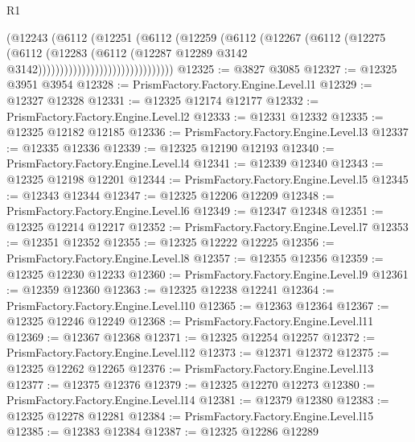 \begin{lexlean}{R1}
\begin{coremodule}
                                        (@12243
                                          (@6112
                                            (@12251
                                              (@6112
                                                (@12259
                                                  (@6112
                                                    (@12267
                                                      (@6112
                                                        (@12275
                                                          (@6112
                                                            (@12283
                                                              (@6112
                                                                (@12287
                                                                  @12289
                                                                  @3142
                                                                  @3142)))))))))))))))))))))))))))))))
@12325 := @3827 @3085
@12327 := @12325 @3951 @3954
@12328 := PrismFactory.Factory.Engine.Level.l1
@12329 := @12327 @12328
@12331 := @12325 @12174 @12177
@12332 := PrismFactory.Factory.Engine.Level.l2
@12333 := @12331 @12332
@12335 := @12325 @12182 @12185
@12336 := PrismFactory.Factory.Engine.Level.l3
@12337 := @12335 @12336
@12339 := @12325 @12190 @12193
@12340 := PrismFactory.Factory.Engine.Level.l4
@12341 := @12339 @12340
@12343 := @12325 @12198 @12201
@12344 := PrismFactory.Factory.Engine.Level.l5
@12345 := @12343 @12344
@12347 := @12325 @12206 @12209
@12348 := PrismFactory.Factory.Engine.Level.l6
@12349 := @12347 @12348
@12351 := @12325 @12214 @12217
@12352 := PrismFactory.Factory.Engine.Level.l7
@12353 := @12351 @12352
@12355 := @12325 @12222 @12225
@12356 := PrismFactory.Factory.Engine.Level.l8
@12357 := @12355 @12356
@12359 := @12325 @12230 @12233
@12360 := PrismFactory.Factory.Engine.Level.l9
@12361 := @12359 @12360
@12363 := @12325 @12238 @12241
@12364 := PrismFactory.Factory.Engine.Level.l10
@12365 := @12363 @12364
@12367 := @12325 @12246 @12249
@12368 := PrismFactory.Factory.Engine.Level.l11
@12369 := @12367 @12368
@12371 := @12325 @12254 @12257
@12372 := PrismFactory.Factory.Engine.Level.l12
@12373 := @12371 @12372
@12375 := @12325 @12262 @12265
@12376 := PrismFactory.Factory.Engine.Level.l13
@12377 := @12375 @12376
@12379 := @12325 @12270 @12273
@12380 := PrismFactory.Factory.Engine.Level.l14
@12381 := @12379 @12380
@12383 := @12325 @12278 @12281
@12384 := PrismFactory.Factory.Engine.Level.l15
@12385 := @12383 @12384
@12387 := @12325 @12286 @12289

\end{coremodule}
\end{lexlean}
